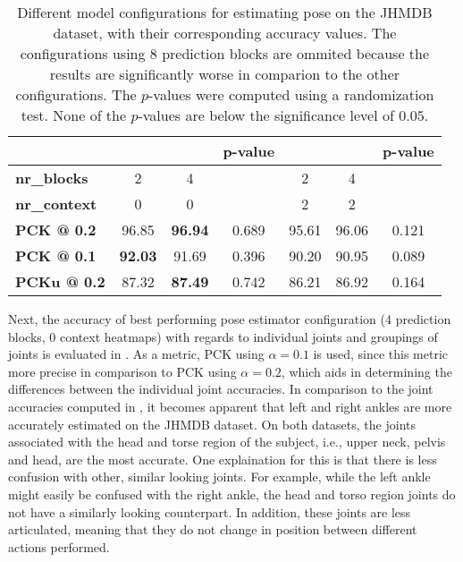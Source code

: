 \begin{table}[]
    \small
    \centering
    \begin{tabular}{|l|c|c|c||c|c|c|}
        \hline
            & & & \textbf{p-value} & & & \textbf{p-value} \\ \hline
            \textbf{nr\_blocks} & 2 & 4 &  & 2 & 4 &  \\ \hline
            \textbf{nr\_context} & 0 & 0 & & 2 & 2 & \\ \hline
            \textbf{PCK @ 0.2} & 96.85 & \textbf{96.94} & 0.689 & 95.61 & 96.06 & 0.121 \\ \hline
            \textbf{PCK @ 0.1} & \textbf{92.03} & 91.69 & 0.396 & 90.20 & 90.95 & 0.089 \\ \hline
            \textbf{PCKu @ 0.2} & 87.32 & \textbf{87.49} & 0.742 & 86.21 & 86.92 & 0.164 \\ \hline
        \end{tabular}
    \caption{Different model configurations for estimating pose on the JHMDB dataset, with their corresponding accuracy values. The configurations using $8$ prediction blocks are ommited because the results are significantly worse in comparion to the other configurations. The $p$-values were computed using a randomization test. None of the $p$-values are below the significance level of $0.05$.}
    \label{tab:jhmdb_results_confidence}
\end{table}

Next, the accuracy of best performing pose estimator configuration ($4$ prediction blocks, $0$ context heatmaps) with regards to individual joints and groupings of joints is evaluated in .
As a metric, PCK using $\alpha = 0.1$ is used, since this metric more precise in comparison to PCK using $\alpha = 0.2$, which aids in determining the differences between the individual joint accuracies.
In comparison to the joint accuracies computed in , it becomes apparent that left and right ankles are more accurately estimated on the JHMDB dataset.
On both datasets, the joints associated with the head and torse region of the subject, i.e., upper neck, pelvis and head, are the most accurate.
One explaination for this is that there is less confusion with other, similar looking joints.
For example, while the left ankle might easily be confused with the right ankle, the head and torso region joints do not have a similarly looking counterpart.
In addition, these joints are less articulated, meaning that they do not change in position between different actions performed.

